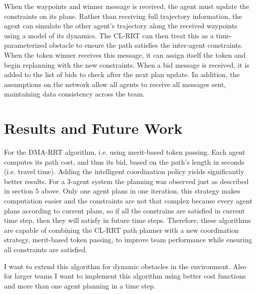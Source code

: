 \documentclass[a4paper]{article}
\begin{document}
When the waypoints and winner message is received, the agent must update the constraints on its plans. Rather than receiving full trajectory information, the agent can simulate the other agent's trajectory along the received waypoints using a model of its dynamics. The CL-RRT can then treat this as a time-parameterized obstacle to ensure the path satisfies the inter-agent constraints. When the token winner receives this message, it can assign itself the token and begin replanning with the new constraints. When a bid message is received, it is added to the list of bids to check after the next plan update. In addition, the assumptions on the network allow all agents to receive all messages sent, maintaining data consistency across the team.

\section{Results and Future Work}
For the DMA-RRT algorithm, i.e. using merit-based token passing. Each agent computes its path cost, and thus its bid, based on the path’s length in seconds (i.e. travel time). Adding the intelligent coordination policy yields significantly better results. For a 3-agent system the planning was observed just as described in section 5 above. Only one agent plans in one iteration, this strategy makes computation easier and the constraints are not that complex because every agent plans according to current plans, so if all the constrains are satisfied in current time step, then they will satisfy in future time steps. Therefore, these algorithms are capable of combining the CL-RRT path planner with a new coordination strategy, merit-based token passing, to improve team performance while ensuring all constraints are satisfied.

I want to extend this algorithm for dynamic obstacles in the environment. Also for larger teams I want to implement this algorithm using better cost functions and more than one agent planning in a time step.
\end{document}
